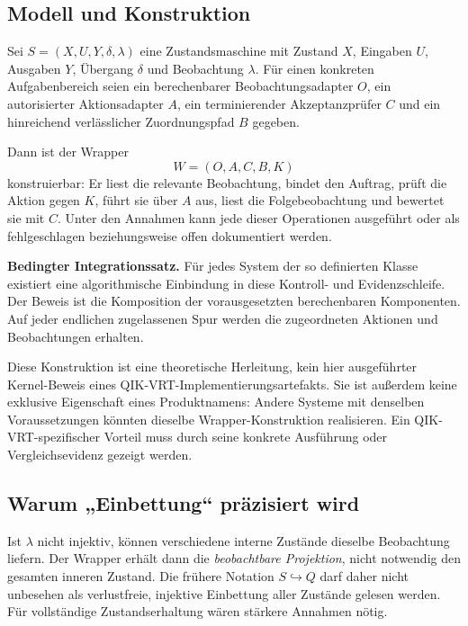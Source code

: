 \begin{cols}
\subsection*{Modell und Konstruktion}
Sei $S=(X,U,Y,\delta,\lambda)$ eine Zustandsmaschine mit Zustand $X$, Eingaben $U$, Ausgaben $Y$, Übergang $\delta$ und Beobachtung $\lambda$. Für einen konkreten Aufgabenbereich seien ein berechenbarer Beobachtungsadapter $O$, ein autorisierter Aktionsadapter $A$, ein terminierender Akzeptanzprüfer $C$ und ein hinreichend verlässlicher Zuordnungspfad $B$ gegeben.

Dann ist der Wrapper
\[
 W=(O,A,C,B,K)
\]
konstruierbar: Er liest die relevante Beobachtung, bindet den Auftrag, prüft die Aktion gegen $K$, führt sie über $A$ aus, liest die Folgebeobachtung und bewertet sie mit $C$. Unter den Annahmen kann jede dieser Operationen ausgeführt oder als fehlgeschlagen beziehungsweise offen dokumentiert werden.

\textbf{Bedingter Integrationssatz.} Für jedes System der so definierten Klasse existiert eine algorithmische Einbindung in diese Kontroll- und Evidenzschleife. Der Beweis ist die Komposition der vorausgesetzten berechenbaren Komponenten. Auf jeder endlichen zugelassenen Spur werden die zugeordneten Aktionen und Beobachtungen erhalten.

Diese Konstruktion ist eine theoretische Herleitung, kein hier ausgeführter Kernel-Beweis eines QIK-VRT-Implementierungsartefakts. Sie ist außerdem keine exklusive Eigenschaft eines Produktnamens: Andere Systeme mit denselben Voraussetzungen könnten dieselbe Wrapper-Konstruktion realisieren. Ein QIK-VRT-spezifischer Vorteil muss durch seine konkrete Ausführung oder Vergleichsevidenz gezeigt werden.

\subsection*{Warum „Einbettung“ präzisiert wird}
Ist $\lambda$ nicht injektiv, können verschiedene interne Zustände dieselbe Beobachtung liefern. Der Wrapper erhält dann die \emph{beobachtbare Projektion}, nicht notwendig den gesamten inneren Zustand. Die frühere Notation $S\hookrightarrow Q$ darf daher nicht unbesehen als verlustfreie, injektive Einbettung aller Zustände gelesen werden. Für vollständige Zustandserhaltung wären stärkere Annahmen nötig.


\end{cols}
